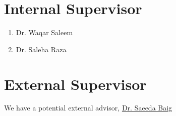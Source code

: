 \documentclass[11pt]{article}
\begin{document}
\section{Internal Supervisor}
\label{lblIntSup}
\begin{enumerate}
    \item Dr. Waqar Saleem
    \item Dr. Saleha Raza
\end{enumerate}

\section{External Supervisor}
\label{lblExtSup}
    
    We have a potential external advisor, \href{https://www.researchgate.net/profile/Saeeda-Baig}{Dr. Saeeda Baig}

\nocite{*}
\printbibliography
\end{document}
